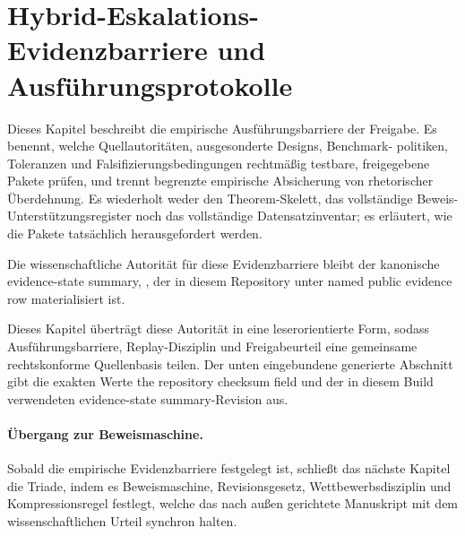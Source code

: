 \section{Hybrid-Eskalations-Evidenzbarriere und Ausführungsprotokolle}
\label{sec:oc-core-1-3-empirical-execution-protocols}

Dieses Kapitel beschreibt die empirische Ausführungsbarriere der Freigabe.
Es benennt, welche Quellautoritäten, ausgesonderte Designs, Benchmark-
politiken, Toleranzen und Falsifizierungsbedingungen rechtmäßig testbare,
freigegebene Pakete prüfen, und trennt begrenzte empirische Absicherung von
rhetorischer Überdehnung. Es wiederholt weder den Theorem-Skelett, das
vollständige Beweis-Unterstützungsregister noch das vollständige
Datensatzinventar; es erläutert, wie die Pakete tatsächlich herausgefordert
werden.

Die wissenschaftliche Autorität für diese Evidenzbarriere bleibt der
kanonische evidence-state summary, , der in diesem
Repository unter
named public evidence row
materialisiert ist.

Dieses Kapitel überträgt diese Autorität in eine leserorientierte Form,
sodass Ausführungsbarriere, Replay-Disziplin und Freigabeurteil eine
gemeinsame rechtskonforme Quellenbasis teilen. Der unten eingebundene generierte
Abschnitt gibt die exakten Werte the repository checksum field und
 der in diesem Build verwendeten evidence-state summary-Revision aus.

\begingroup
\small

\endgroup

\paragraph{Übergang zur Beweismaschine.}
Sobald die empirische Evidenzbarriere festgelegt ist, schließt das nächste
Kapitel die Triade, indem es Beweismaschine, Revisionsgesetz,
Wettbewerbsdisziplin und Kompressionsregel festlegt, welche das nach außen
gerichtete Manuskript mit dem wissenschaftlichen Urteil synchron halten.
